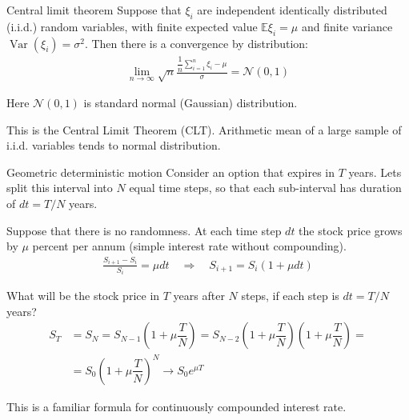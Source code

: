 \documentclass{beamer}
\begin{document}
\begin{frame}{Central limit theorem}
\justify
Suppose that $\xi_i$ are independent identically distributed (i.i.d.) random variables, with finite expected value $\mathbb{E}\xi_i=\mu$ and finite variance $\operatorname{Var}(\xi_i) = \sigma^2$. Then there is a convergence by distribution:
\begin{align*}
\lim_{n \to \infty} \sqrt{n}\frac{\dfrac{1}{n}\sum\limits_{i=1}^{n}\xi_i - \mu}{\sigma} = \mathcal{N}(0, 1)
\end{align*}

\justify
Here $\mathcal{N}(0, 1)$ is standard normal (Gaussian) distribution.

\justify
This is the Central Limit Theorem (CLT). Arithmetic mean of a large sample of i.i.d. variables tends to normal distribution.
\end{frame}




\begin{frame}{Geometric deterministic motion}
\justify
Consider an option that expires in $T$ years. Lets split this interval into $N$ equal time steps, so that each sub-interval has duration of $dt = T/N$ years.

\justify
Suppose that there is no randomness. At each time step $dt$ the stock price grows by $\mu$ percent per annum (simple interest rate without compounding). 
\begin{align*}
\frac{S_{i+1} - S_i}{S_i} = \mu dt \quad \Rightarrow \quad S_{i+1} = S_i(1 + \mu dt)
\end{align*}

\justify
What will be the stock price in $T$ years after $N$ steps, if each step is $dt=T/N$ years?
\begin{align*}
S_T &= S_N = S_{N-1}\left(1+\mu\dfrac{T}{N}\right) 
= S_{N-2}\left(1+\mu\dfrac{T}{N}\right)\left(1+\mu\dfrac{T}{N}\right) = \\
&= S_0\left(1+\mu\dfrac{T}{N}\right)^N \to S_0e^{\mu T}
\end{align*}

\justify
This is a familiar formula for continuously compounded interest rate.
\end{frame}



\newcommand{\plotDterministicMotion}[2] {
	
	\addplot[
		color = #2,
		mark = none,
		thick
	] 
	table[
		x=t,
		y=trend,
		col sep=comma
	]
	{#1};
}
\end{document}
